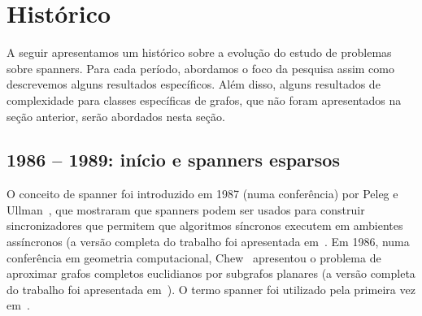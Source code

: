 

\section{Histórico}
A seguir apresentamos um histórico sobre a evolução do estudo de problemas sobre spanners. Para cada período, abordamos o foco da pesquisa assim como descrevemos alguns resultados específicos. Além disso, alguns resultados de complexidade para classes específicas de grafos, que não foram apresentados na seção anterior, serão abordados nesta seção.

\subsection{1986 -- 1989: início e spanners esparsos}
O conceito de spanner foi introduzido em 1987 (numa conferência) por Peleg e Ullman~\cite{PelegU1987}, que mostraram que spanners podem ser usados para construir sincronizadores que permitem que algoritmos síncronos executem em ambientes assíncronos (a versão completa do trabalho foi apresentada em~\cite{PelegU1989}.  Em 1986, numa conferência em geometria computacional, Chew~\cite{Chew1986} apresentou o problema de aproximar grafos completos euclidianos por subgrafos planares (a versão completa do trabalho foi apresentada em~\cite{Chew1989}). O termo spanner foi utilizado pela primeira vez em~\cite{PelegS1989}.

